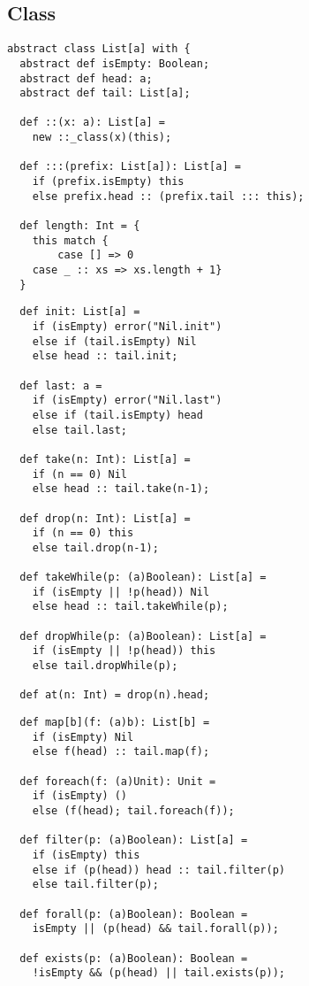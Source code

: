 \documentclass[a4paper,12pt,twoside,titlepage]{book}
\begin{document}
\subsection{Class }\label{cls-list}

\begin{lstlisting}
abstract class List[a] with {
  abstract def isEmpty: Boolean;
  abstract def head: a;
  abstract def tail: List[a];

  def ::(x: a): List[a] =
    new ::_class(x)(this);

  def :::(prefix: List[a]): List[a] =
    if (prefix.isEmpty) this
    else prefix.head :: (prefix.tail ::: this);

  def length: Int = {
    this match {
        case [] => 0
    case _ :: xs => xs.length + 1}
  }
\end{lstlisting}
\begin{lstlisting}
  def init: List[a] =
    if (isEmpty) error("Nil.init")
    else if (tail.isEmpty) Nil
    else head :: tail.init;

  def last: a =
    if (isEmpty) error("Nil.last")
    else if (tail.isEmpty) head
    else tail.last;

  def take(n: Int): List[a] =
    if (n == 0) Nil
    else head :: tail.take(n-1);

  def drop(n: Int): List[a] =
    if (n == 0) this
    else tail.drop(n-1);

  def takeWhile(p: (a)Boolean): List[a] =
    if (isEmpty || !p(head)) Nil
    else head :: tail.takeWhile(p);

  def dropWhile(p: (a)Boolean): List[a] =
    if (isEmpty || !p(head)) this
    else tail.dropWhile(p);

  def at(n: Int) = drop(n).head;
\end{lstlisting}
\begin{lstlisting}
  def map[b](f: (a)b): List[b] =
    if (isEmpty) Nil
    else f(head) :: tail.map(f);

  def foreach(f: (a)Unit): Unit =
    if (isEmpty) ()
    else (f(head); tail.foreach(f));

  def filter(p: (a)Boolean): List[a] =
    if (isEmpty) this
    else if (p(head)) head :: tail.filter(p)
    else tail.filter(p);

  def forall(p: (a)Boolean): Boolean =
    isEmpty || (p(head) && tail.forall(p));

  def exists(p: (a)Boolean): Boolean =
    !isEmpty && (p(head) || tail.exists(p));
\end{lstlisting}
\end{document}
